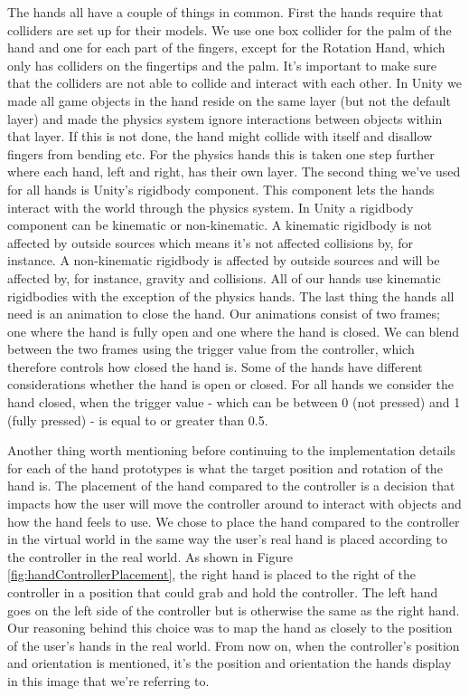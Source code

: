 The hands all have a couple of things in common. First the hands require that colliders are set up for their models. We use one box collider for the palm of the hand and one for each part of the fingers, except for the Rotation Hand, which only has colliders on the fingertips and the palm. It's important to make sure that the colliders are not able to collide and interact with each other. In Unity we made all game objects in the hand reside on the same layer (but not the default layer) and made the physics system ignore interactions between objects within that layer. If this is not done, the hand might collide with itself and disallow fingers from bending etc. For the physics hands this is taken one step further where each hand, left and right, has their own layer. The second thing we've used for all hands is Unity's rigidbody component. This component lets the hands interact with the world through the physics system. In Unity a rigidbody component can be kinematic or non-kinematic. A kinematic rigidbody is not affected by outside sources which means it's not affected collisions by, for instance. A non-kinematic rigidbody is affected by outside sources and will be affected by, for instance, gravity and collisions. All of our hands use kinematic rigidbodies with the exception of the physics hands. The last thing the hands all need is an animation to close the hand. Our animations consist of two frames; one where the hand is fully open and one where the hand is closed. We can blend between the two frames using the trigger value from the controller, which therefore controls how closed the hand is. Some of the hands have different considerations whether the hand is open or closed. For all hands we consider the hand closed, when the trigger value - which can be between 0 (not pressed) and 1 (fully pressed) - is equal to or greater than 0.5.

Another thing worth mentioning before continuing to the implementation details for each of the hand prototypes is what the target position and rotation of the hand is. The placement of the hand compared to the controller is a decision that impacts how the user will move the controller around to interact with objects and how the hand feels to use. We chose to place the hand compared to the controller in the virtual world in the same way the user's real hand is placed according to the controller in the real world. As shown in Figure \ref{fig:handControllerPlacement}, the right hand is placed to the right of the controller in a position that could grab and hold the controller. The left hand goes on the left side of the controller but is otherwise the same as the right hand. Our reasoning behind this choice was to map the hand as closely to the position of the user's hands in the real world. From now on, when the controller's position and orientation is mentioned, it's the position and orientation the hands display in this image that we're referring to.

